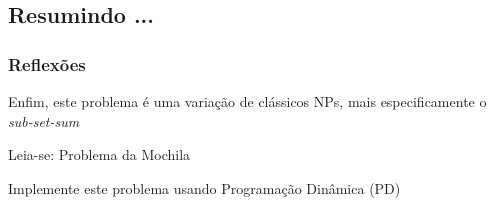 \documentclass{beamer}
\begin{document}
\subsection{Resumindo ... }

\begin{frame}
\frametitle{Reflexões}
\begin{block}{}   %
\begin{flushleft}

\vspace{1cm}
 \textsf{Enfim, este problema é uma variação de clássicos
NPs, mais especificamente o \textit{sub-set-sum}}

\vspace{1cm}
 \textsf{Leia-se: Problema da Mochila}


\vspace{1cm}
 \textsf{Implemente este problema usando Programação Dinâmica (PD)}

      \end{flushleft}

    \end{block}
  \end{frame}




\end{document}
